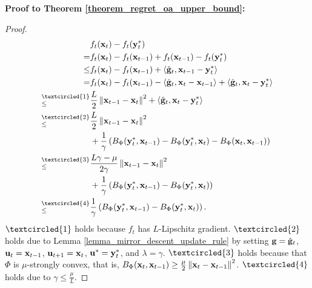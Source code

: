 \documentclass[journal]{IEEEtran}
\begin{document}
\textbf{Proof to Theorem \ref{theorem_regret_oa_upper_bound}:}
\begin{proof}

\begin{align}
\nonumber
& f_t(\x_t) - f_t(\y_t^{\ast}) \\ \nonumber
= & f_t(\x_t) - f_t(\x_{t-1}) + f_t(\x_{t-1}) - f_t(\y_t^{\ast}) \\ \nonumber
\le & f_t(\x_t) - f_t(\x_{t-1}) +\lrangle{\hat{\g}_t, \x_{t-1} - \y_t^{\ast}} \\ \nonumber
= & f_t(\x_t) - f_t(\x_{t-1}) - \lrangle{\hat{\g}_t, \x_t - \x_{t-1}} +  \lrangle{\hat{\g}_t, \x_t - \y_t^{\ast}} \\ \nonumber
\refabovecir{\le}{\textcircled{1}} & \frac{L}{2}\lrnorm{\x_{t-1} - \x_t}^2 +  \lrangle{\hat{\g}_t, \x_t - \y_t^{\ast}} \\ \nonumber
\refabovecir{\le}{\textcircled{2}} & \frac{L}{2}\lrnorm{\x_{t-1} - \x_t}^2  \\ \nonumber
& + \frac{1}{\gamma}\lrincir{ B_{\Phi}(\y_t^\ast, \x_{t-1}) -  B_{\Phi}(\y_t^\ast, \x_t) - B_{\Phi}(\x_t, \x_{t-1}) } \\ \nonumber
\refabovecir{\le}{\textcircled{3}} & \frac{L\gamma-\mu}{2\gamma}\lrnorm{\x_{t-1} - \x_t}^2 \\ \nonumber
& + \frac{1}{\gamma}\lrincir{ B_{\Phi}(\y_t^\ast, \x_{t-1}) -  B_{\Phi}(\y_t^\ast, \x_t)} \\ \label{equa_theorem_upper_bound_oa_temp1}
\refabovecir{\le}{\textcircled{4}} & \frac{1}{\gamma}\lrincir{ B_{\Phi}(\y_t^\ast, \x_{t-1}) -  B_{\Phi}(\y_t^\ast, \x_t)}.
\end{align} $\textcircled{1}$ holds because $f_t$ has $L$-Lipschitz gradient. $\textcircled{2}$ holds due to Lemma \ref{lemma_mirror_descent_update_rule} by setting ${\bf g} = \hat{{\bf g}}_t$, ${\bf u}_t = {\bf x}_{t-1}$, ${\bf u}_{t+1} = {\bf x}_t$, ${\bf u}^\ast = {\bf y}_t^\ast$, and $\lambda = \gamma$. $\textcircled{3}$ holds because that $\Phi$ is $\mu$-strongly convex, that is, $B_{\Phi}({\bf x}_t, {\bf x}_{t-1}) \ge \frac{\mu}{2}\left\lVert{\bf x}_t - {\bf x}_{t-1}\right\rVert^2$. $\textcircled{4}$ holds due to $\gamma \le \frac{\mu}{L}$.



\end{proof}
\end{document}

